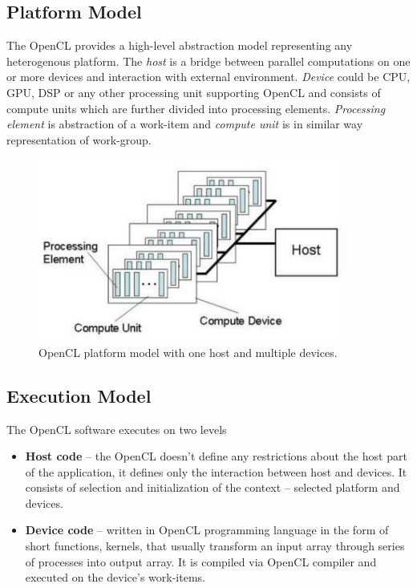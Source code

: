 \subsection{Platform Model}
The OpenCL provides a high-level abstraction model representing any heterogenous
platform. The \textit{host} is a bridge between parallel computations on one or
more devices and interaction with external environment. \textit{Device} could be
CPU, GPU, DSP or any other processing unit supporting OpenCL and consists
of compute units which are further divided into processing elements. 
\textit{Processing element} is abstraction of a work-item and 
\textit{compute unit} is in similar way representation of work-group.

\begin{figure}[H]
\centering
\includegraphics[width=10cm]{fig/opencl_platform_model.jpg}
\caption{OpenCL platform model with one host and multiple devices\cite{opencl}.}
\label{oclpm}
\end{figure}


\subsection{Execution Model}
The OpenCL software executes on two levels
\begin{itemize}
\item \textbf{Host code} -- the OpenCL doesn't define any restrictions about the 
host part of the application, it defines only the interaction between host and 
devices. It consists of selection and initialization of the context -- selected 
platform and devices.
\item \textbf{Device code} -- written in OpenCL programming language in the form
of short functions, kernels, that usually transform an input array through 
series of processes into output array. It is compiled via OpenCL compiler and 
executed on the device's work-items.
\end{itemize}

